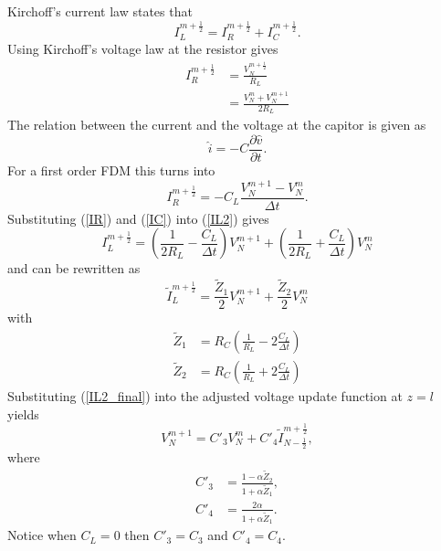 \begin{itemize}
    Kirchoff's current law states that
    \begin{equation}
        I^{m+\frac{1}{2}}_{L} = I^{m+\frac{1}{2}}_{R} + I^{m+\frac{1}{2}}_{C}.
        \label{IL2}
    \end{equation}
    Using Kirchoff's voltage law at the resistor gives
    \begin{align}
        I^{m+\frac{1}{2}}_{R} & = \frac{V^{m+\frac{1}{2}}_{N}}{R_{L}}\\
        & = \frac{V^{m}_{N}+V^{m+1}_{N}}{2R_{L}}
        \label{IR}
    \end{align}
    The relation between the current and the voltage at the capitor is given as
    \begin{equation}
        \hat{i} = -C\frac{\partial \hat{v}}{\partial t}.
    \end{equation}
    For a first order FDM this turns into
    \begin{equation}
        I^{m+\frac{1}{2}}_{R} = -C_{L}\frac{V^{m+1}_{N} - V^{m}_{N}}{\Delta t}.
        \label{IC}
    \end{equation}
    Substituting (\ref{IR}) and (\ref{IC}) into (\ref{IL2}) gives
    \begin{equation}
        I^{m+\frac{1}{2}}_{L} = \left(\frac{1}{2R_{L}}-\frac{C_{L}}{\Delta t}\right)V^{m+1}_N + \left(\frac{1}{2R_{L}}+\frac{C_{L}}{\Delta t}\right)V^{m}_N
    \end{equation}
    and can be rewritten as
    \begin{equation}
        \tilde{I}^{m+\frac{1}{2}}_{L} = \frac{\tilde{Z}_{1}}{2}V^{m+1}_N + \frac{\tilde{Z}_{2}}{2}V^{m}_N
        \label{IL2_final}
    \end{equation}
    with
    \begin{align}
        \tilde{Z}_{1} &= R_{C}\left(\frac{1}{R_{L}}-2\frac{C_{L}}{\Delta t}\right)\\
        \tilde{Z}_{2} &= R_{C}\left(\frac{1}{R_{L}}+2\frac{C_{L}}{\Delta t}\right)
    \end{align}
    Substituting (\ref{IL2_final}) into the adjusted voltage update function at $z=l$ yields
    \begin{equation}
        V^{m+1}_{N} = C'_{3}V^{m}_N + C'_{4}\tilde{I}^{m+\frac{1}{2}}_{N-\frac{1}{2}},
    \end{equation}
    where
    \begin{align}
        C'_{3} & = \frac{1-\alpha\tilde{Z}_{2}}{1+\alpha\tilde{Z}_{1}},\\
        C'_{4} & = \frac{2\alpha}{1+\alpha\tilde{Z}_{1}}.
    \end{align}
    Notice when $C_{L} = 0$ then $C'_{3} = C_{3}$ and $C'_{4} = C_{4}$.
\end{itemize}
